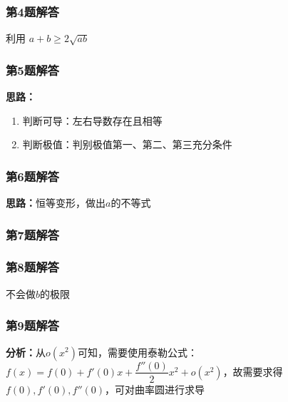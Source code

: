 \documentclass[./book.tex]{subfiles}
\begin{document}
    \subsubsection*{第4题解答}
    \begin{analysisbox}
        利用 $a + b \geq 2\sqrt{ab}$
    \end{analysisbox}

    \subsubsection*{第5题解答}
    \begin{analysisbox}
        \textbf{思路：}
        \begin{enumerate}
            \item 判断可导：左右导数存在且相等
            \item 判断极值：判别极值第一、第二、第三充分条件
        \end{enumerate}
    \end{analysisbox}

    \subsubsection*{第6题解答}
    \begin{analysisbox}
        \textbf{思路：}恒等变形，做出$a$的不等式
    \end{analysisbox}

    \subsubsection*{第7题解答}
    \begin{analysisbox}
    \end{analysisbox}

    \subsubsection*{第8题解答}
    \begin{analysisbox}
        不会做$b$的极限
    \end{analysisbox}

    \subsubsection*{第9题解答}
    \begin{analysisbox}
        \textbf{分析：}从$o(x^2)$可知，需要使用泰勒公式：$f(x) = f(0) + f'(0)x + \dfrac{f''(0)}{2}x^2 + o(x^2)$，故需要求得$f(0), f'(0), f''(0)$，可对曲率圆进行求导
    \end{analysisbox}
\end{document}
